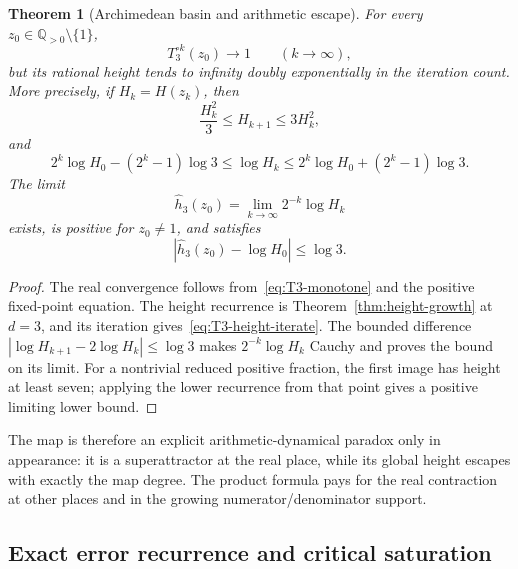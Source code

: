 \documentclass[11pt,oneside]{article}
\newtheorem{theorem}{Theorem}[section]
\theoremstyle{definition}
\theoremstyle{remark}
\newcommand{\Q}{\mathbb Q}
\begin{document}
\begin{theorem}[Archimedean basin and arithmetic escape]
\label{thm:basin-height}
For every \(z_0\in\Q_{>0}\setminus\{1\}\),
\begin{equation}
 T_3^{\circ k}(z_0)\longrightarrow1
 \qquad(k\to\infty),
 \label{eq:real-convergence}
\end{equation}
but its rational height tends to infinity doubly exponentially in the iteration count.  More
precisely, if \(H_k=H(z_k)\), then
\begin{equation}
 \frac{H_k^2}{3}\le H_{k+1}\le3H_k^2,
 \label{eq:T3-height-recurrence}
\end{equation}
and
\begin{equation}
 2^k\log H_0-(2^k-1)\log3
 \le\log H_k\le
 2^k\log H_0+(2^k-1)\log3.
 \label{eq:T3-height-iterate}
\end{equation}
The limit
\begin{equation}
 \widehat h_3(z_0)=\lim_{k\to\infty}2^{-k}\log H_k
 \label{eq:canonical-height}
\end{equation}
exists, is positive for \(z_0\ne1\), and satisfies
\begin{equation}
 \left|\widehat h_3(z_0)-\log H_0\right|
 \le \log 3.
 \label{eq:canonical-height-bound}
\end{equation}
\end{theorem}

\begin{proof}
The real convergence follows from~\eqref{eq:T3-monotone} and the positive fixed-point
equation.  The height recurrence is Theorem~\ref{thm:height-growth} at \(d=3\), and its
iteration gives~\eqref{eq:T3-height-iterate}.  The bounded difference
\(|\log H_{k+1}-2\log H_k|\le\log3\) makes \(2^{-k}\log H_k\) Cauchy and proves the
bound on its limit.  For a nontrivial reduced positive fraction, the first image has height at
least seven; applying the lower recurrence from that point gives a positive limiting lower
bound.
\end{proof}

The map is therefore an explicit arithmetic-dynamical paradox only in appearance: it is a
superattractor at the real place, while its global height escapes with exactly the map degree.
The product formula pays for the real contraction at other places and in the growing
numerator/denominator support.

\subsection{Exact error recurrence and critical saturation}
\end{document}
